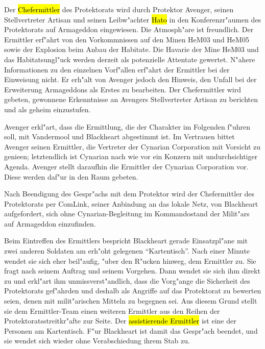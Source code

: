 \newpage


Der \hl{Chefermittler} des Protektorats wird durch Protektor Avenger, seinen Stellvertreter Artisan und seinen Leibw"achter \hl{Hato} in den Konferenzr"aumen des Protektorats auf Armageddon eingewiesen. Die Atmosph"are ist freundlich. Der Ermittler erf"ahrt von den Vorkommnissen auf den Minen HeM03 und HeM05 sowie der Explosion beim Anbau der Habitate. Die Havarie der Mine HeM03 und das Habitatsungl"uck werden derzeit als potenzielle Attentate gewertet. N"ahere Informationen zu den einzelnen Vorf"allen erf"ahrt der Ermittler bei der Einweisung nicht. Er erh"alt von Avenger jedoch den Hinweis, den Unfall bei der Erweiterung Armageddons als Erstes zu bearbeiten. Der Chefermittler wird gebeten, gewonnene Erkenntnisse an Avengers Stellvertreter Artisan zu berichten und als geheim einzustufen.

Avenger erkl"art, dass die Ermittlung, die der Charakter im Folgenden f"uhren soll, mit Vandermool und Blackheart abgestimmt ist. Im Vertrauen bittet Avenger seinen Ermittler, die Vertreter der Cynarian Corporation mit Vorsicht zu genie\3en; letztendlich ist Cynarian nach wie vor ein Konzern mit undurchsichtiger Agenda. Avenger stellt daraufhin die Ermittler der Cynarian Corporation vor. Diese werden daf"ur in den Raum gebeten.

Nach Beendigung des Gespr"achs mit dem Protektor wird der Chefermittler des Protektorats per ComLink, seiner Anbindung an das lokale Netz, von Blackheart aufgefordert, sich ohne Cynarian-Begleitung im Kommandostand der Milit"ars auf Armageddon einzufinden.

Beim Eintreffen des Ermittlers bespricht Blackheart gerade Einsatzpl"ane mit zwei anderen Soldaten am erh"oht gelegenen ``Kartentisch''. Nach einer Minute wendet sie sich eher beil"aufig, "uber den R"ucken hinweg, dem Ermittler zu. Sie fragt nach seinem Auftrag und seinem Vorgehen. Dann wendet sie sich ihm direkt zu und erkl"art ihm unmissverst"andlich, dass die Vorg"ange die Sicherheit des Protektorats gef"ahrden und deshalb als Angriffe auf das Protektorat zu bewerten seien, denen mit milit"arischen Mitteln zu begegnen sei. Aus diesem Grund stellt sie dem Ermittler-Team einen weiteren Ermittler aus den Reihen der Protektoratsstreitkr"afte zur Seite. Der \hl{assistierende Ermittler} ist eine der Personen am Kartentisch. F"ur Blackheart ist damit das Gespr"ach beendet, und sie wendet sich wieder ohne Verabschiedung ihrem Stab zu.
\vfill

